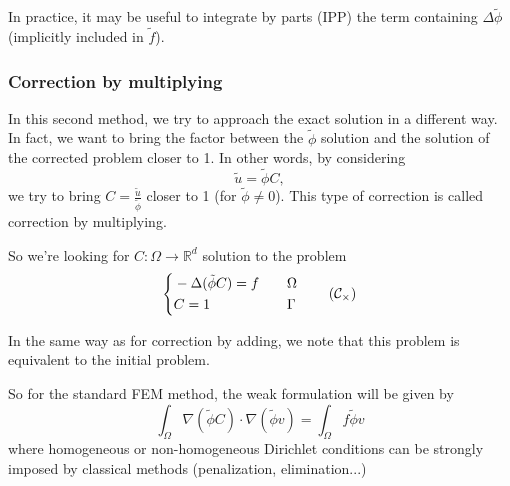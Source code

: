 \begin{Rem}
	In practice, it may be useful to integrate by parts (IPP) the term containing $\Delta \tilde{\phi}$ (implicitly included in $\tilde{f}$). 
\end{Rem}

\subsubsection{Correction by multiplying} \label{Corr.method.mult}

In this second method, we try to approach the exact solution in a different way. In fact, we want to bring the factor between the $\tilde{\phi}$ solution and the solution of the corrected problem closer to 1. In other words, by considering 
\begin{equation*}
	\tilde{u}=\tilde{\phi}C,
\end{equation*}
we try to bring $C=\frac{\tilde{u}}{\tilde{\phi}}$ closer to 1 (for $\tilde{\phi}\ne 0$). This type of correction is called correction by multiplying.

So we're looking for $C: \Omega \rightarrow \mathbb{R}^d$ solution to the problem
\begin{equation}
	\label{eq.corr.pbc_mult}
	\left\{\begin{aligned}
		&-\Delta (\tilde{\phi}C)=f \quad &&\Omega \\
		&C=1 \quad &&\Gamma
	\end{aligned}\right. \tag{$\mathcal{C}_\times$}
\end{equation}

\begin{Rem}
	In the same way as for correction by adding, we note that this problem is equivalent to the initial  problem.
\end{Rem}

So for the standard FEM method, the weak formulation will be given by
\begin{equation*}
	\int_\Omega \nabla (\tilde{\phi}C)\cdot\nabla (\tilde{\phi}v)=\int_\Omega f\tilde{\phi}v
\end{equation*}
where homogeneous or non-homogeneous Dirichlet conditions can be strongly imposed by classical methods (penalization, elimination...)

